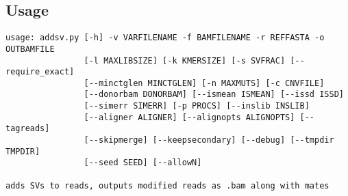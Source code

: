 \documentclass[letterpaper,11pt]{article}
\begin{document}
\subsection{Usage}
\begin{verbatim}
usage: addsv.py [-h] -v VARFILENAME -f BAMFILENAME -r REFFASTA -o OUTBAMFILE
                [-l MAXLIBSIZE] [-k KMERSIZE] [-s SVFRAC] [--require_exact]
                [--minctglen MINCTGLEN] [-n MAXMUTS] [-c CNVFILE]
                [--donorbam DONORBAM] [--ismean ISMEAN] [--issd ISSD]
                [--simerr SIMERR] [-p PROCS] [--inslib INSLIB]
                [--aligner ALIGNER] [--alignopts ALIGNOPTS] [--tagreads]
                [--skipmerge] [--keepsecondary] [--debug] [--tmpdir TMPDIR]
                [--seed SEED] [--allowN]

adds SVs to reads, outputs modified reads as .bam along with mates


\end{verbatim}
\end{document}
